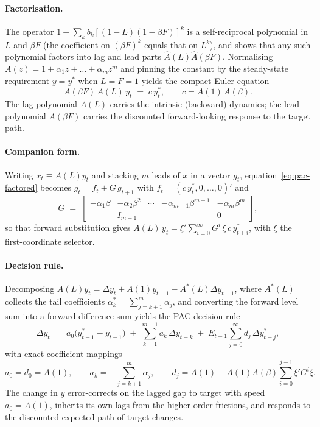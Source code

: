 \paragraph{Factorisation.} The operator $1+\sum_k b_k[(1-L)(1-\beta F)]^k$ is a self-reciprocal polynomial in $L$ and $\beta F$ (the coefficient on $(\beta F)^k$ equals that on $L^k$), and \citet{tinsley1993} shows that any such polynomial factors into lag and lead parts $\hat A(L)\hat A(\beta F)$. Normalising $A(z)=1+\alpha_1 z+\dots+\alpha_m z^m$ and pinning the constant by the steady-state requirement $y=y^{*}$ when $L=F=1$ yields the compact Euler equation
\begin{equation}
A(\beta F)\,A(L)\,y_t \;=\; c\,y^{*}_t, \qquad c = A(1)\,A(\beta).
\label{eq:pac-factored}
\end{equation}
The lag polynomial $A(L)$ carries the intrinsic (backward) dynamics; the lead polynomial $A(\beta F)$ carries the discounted forward-looking response to the target path.

\paragraph{Companion form.} Writing $x_t\equiv A(L)y_t$ and stacking $m$ leads of $x$ in a vector $g_t$, equation~\eqref{eq:pac-factored} becomes $g_t = f_t + G\,g_{t+1}$ with $f_t=(c\,y^*_t,0,\dots,0)'$ and
\begin{equation}
G \;=\; \begin{bmatrix} -\alpha_1\beta & -\alpha_2\beta^2 & \cdots & -\alpha_{m-1}\beta^{m-1} & -\alpha_m\beta^m \\[2pt] & I_{m-1} & & & 0 \end{bmatrix},
\label{eq:pac-G}
\end{equation}
so that forward substitution gives $A(L)\,y_t = \xi'\sum_{i=0}^{\infty} G^{i}\,\xi\, c\, y^{*}_{t+i}$, with $\xi$ the first-coordinate selector.

\paragraph{Decision rule.} Decomposing $A(L)y_t = \Delta y_t + A(1)y_{t-1} - A^{*}(L)\Delta y_{t-1}$, where $A^{*}(L)$ collects the tail coefficients $\alpha^{*}_k=\sum_{j=k+1}^{m}\alpha_j$, and converting the forward level sum into a forward difference sum yields the PAC decision rule
\begin{equation}
\Delta y_t \;=\; a_0\big(y^{*}_{t-1}-y_{t-1}\big) \;+\; \sum_{k=1}^{m-1} a_k\,\Delta y_{t-k} \;+\; E_{t-1}\sum_{j=0}^{\infty} d_j\,\Delta y^{*}_{t+j},
\label{eq:pac-rule}
\end{equation}
with exact coefficient mappings
\begin{equation}
a_0 = d_0 = A(1), \qquad a_k = -\sum_{j=k+1}^{m}\alpha_j, \qquad
d_j = A(1) - A(1)A(\beta)\sum_{i=0}^{j-1}\xi' G^{i}\xi .
\label{eq:pac-coeffs}
\end{equation}
The change in $y$ error-corrects on the lagged gap to target with speed $a_0=A(1)$, inherits its own lags from the higher-order frictions, and responds to the discounted expected path of target changes.

